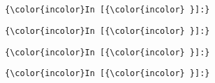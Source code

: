\documentclass[11pt]{article}
\begin{document}
    \begin{center}
    \end{center}
    { \hspace*{\fill} \\}
    
    \begin{center}
    \end{center}
    { \hspace*{\fill} \\}
    
    \begin{Verbatim}[commandchars=\\\{\}]
{\color{incolor}In [{\color{incolor} }]:} 
\end{Verbatim}

    \begin{Verbatim}[commandchars=\\\{\}]
{\color{incolor}In [{\color{incolor} }]:} 
\end{Verbatim}

    \begin{Verbatim}[commandchars=\\\{\}]
{\color{incolor}In [{\color{incolor} }]:} 
\end{Verbatim}

    \begin{Verbatim}[commandchars=\\\{\}]
{\color{incolor}In [{\color{incolor} }]:} 
\end{Verbatim}


    
    
    
    
\end{document}
